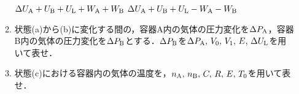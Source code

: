 \begin{enumerate}
\begin{enumerate}[（1）]
    \quad $\Delta U_{\rm A}+U_{\rm B}+U_{\rm L}+W_{\rm A}+W_{\rm B}$ 
    \quad $\Delta U_{\rm A}+U_{\rm B}+U_{\rm L}-W_{\rm A}-W_{\rm B}$ \mbox{}
    \item 状態(a)から(b)に変化する間の，容器A内の気体の圧力変化を$\Delta P_{\rm A}$，容器B内の気体の圧力変化を$\Delta P_{\rm B}$とする．$\Delta P_{\rm B}$を$\Delta P_{\rm A},\,V_0,\,V_1,\,E,\,\Delta U_{\rm L}$を用いて表せ．
    \item 状態(c)における容器内の気体の温度を，$n_{\rm A},\,n_{\rm B},\,C,\,R,\,E,\,T_0$を用いて表せ．
  \end{enumerate}
\end{enumerate}


